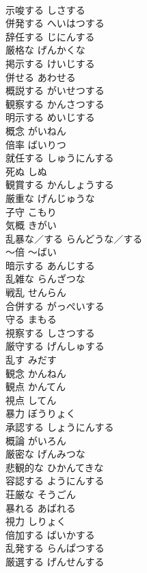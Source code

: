 \documentclass[8pt]{extreport}
\begin{document}
\begin{CJK}{UTF8}{min}
\\	示唆する	しさする	
\\	併発する	へいはつする	
\\	辞任する	じにんする	
\\	厳格な	げんかくな	
\\	掲示する	けいじする	
\\	併せる	あわせる	
\\	概説する	がいせつする	
\\	観察する	かんさつする	
\\	明示する	めいじする	
\\	概念	がいねん	
\\	倍率	ばいりつ	
\\	就任する	しゅうにんする	
\\	死ぬ	しぬ	
\\	観賞する	かんしょうする	
\\	厳重な	げんじゅうな	
\\	子守	こもり	
\\	気概	きがい	
\\	乱暴な／する	らんどうな／する	
\\	～倍	～ばい	
\\	暗示する	あんじする	
\\	乱雑な	らんざつな	
\\	戦乱	せんらん	
\\	合併する	がっぺいする	
\\	守る	まもる	
\\	視察する	しさつする	
\\	厳守する	げんしゅする	
\\	乱す	みだす	
\\	観念	かんねん	
\\	観点	かんてん	
\\	視点	してん	
\\	暴力	ぼうりょく	
\\	承認する	しょうにんする	
\\	概論	がいろん	
\\	厳密な	げんみつな	
\\	悲観的な	ひかんてきな	
\\	容認する	ようにんする	
\\	荘厳な	そうごん	
\\	暴れる	あばれる	
\\	視力	しりょく	
\\	倍加する	ばいかする	
\\	乱発する	らんぱつする	
\\	厳選する	げんせんする	

\end{CJK}
\end{document}
